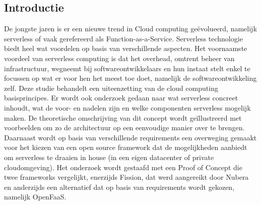 \documentclass[a0,portrait]{a0poster}
\begin{document}
\begin{multicols}{2}
\section*{Introductie}
\color{black}
\color{black}
De jongste jaren is er een nieuwe trend in Cloud computing geëvolueerd, namelijk serverless of vaak gerefereerd als Function-as-a-Service. Serverless technologie biedt heel wat voordelen op basis van verschillende aspecten. Het voornaamste voordeel van serverless computing is dat het overhead, omtrent beheer van infrastructuur, wegneemt bij softwareontwikkelaars en hun instaat stelt enkel te focussen op wat er voor hen het meest toe doet, namelijk de softwareontwikkeling zelf.
Deze studie behandelt een uiteenzetting van de cloud computing basisprincipes. Er wordt ook onderzoek gedaan naar wat serverless concreet inhoudt, wat de voor- en nadelen zijn en welke componenten serverless mogelijk maken. De theoretische omschrijving van dit concept wordt geïllustreerd met voorbeelden om zo de architectuur op een eenvoudige manier over te brengen. Daarnaast wordt op basis van verschillende requirements een overweging gemaakt voor het kiezen van een open source framework dat de mogelijkheden aanbiedt om serverless te draaien in house (in een eigen datacenter of private cloudomgeving). Het onderzoek wordt gestaafd met een Proof of Concept die twee frameworks vergelijkt, enerzijds Fission, dat werd aangereikt door Nubera en anderzijds een alternatief dat op basis van requirements wordt gekozen, namelijk OpenFaaS. 

\color{Black} %
\color{HoGentAccent1} 

\end{multicols}
\end{document}
